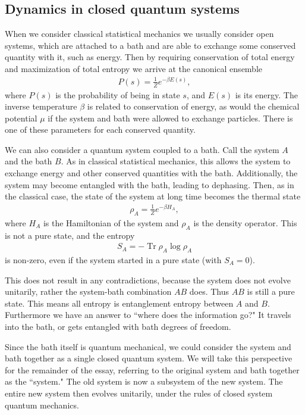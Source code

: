 \documentclass[a4paper,11pt]{article}
\renewcommand{\th}[1]{\frac{1}{#1}}
\DeclareMathOperator{\Tr}{Tr}
\begin{document}
\subsection{Dynamics in closed quantum systems} \label{sub:closed}

When we consider classical statistical mechanics we usually consider open systems, which are attached to a bath and are able to exchange some conserved quantity with it, such as energy. Then by requiring conservation of total energy and maximization of total entropy we arrive at the canonical ensemble
\begin{align}
P(s)=\th{Z}e^{-\beta E(s)},
\end{align}
where $P(s)$ is the probability of being in state $s$, and $E(s)$ is its energy. The inverse temperature $\beta$ is related to conservation of energy, as would the chemical potential $\mu$ if the system and bath were allowed to exchange particles. There is one of these parameters for each conserved quantity.

We can also consider a quantum system coupled to a bath. Call the system $A$ and the bath $B$. As in classical statistical mechanics, this allows the system to exchange energy and other conserved quantities with the bath. Additionally, the system may become entangled with the bath, leading to dephasing. Then, as in the classical case, the state of the system at long time becomes the thermal state
\begin{align}
\rho_A = \th{Z}e^{-\beta H_A},
\end{align}
where $H_A$ is the Hamiltonian of the system and $\rho_A$ is the density operator. This is not a pure state, and the entropy
\begin{align}
S_A=-\Tr\rho_A\log\rho_A
\end{align}
is non-zero, even if the system started in a pure state (with $S_A=0$).

This does not result in any contradictions, because the system does not evolve unitarily, rather the system-bath combination $AB$ does. Thus $AB$ is still a pure state. This means all entropy is entanglement entropy between $A$ and $B$. Furthermore we have an answer to ``where does the information go?" It travels into the bath, or gets entangled with bath degrees of freedom. 

Since the bath itself is quantum mechanical, we could consider the system and bath together as a single closed quantum system. We will take this perspective for the remainder of the essay, referring to the original system and bath together as the ``system." The old system is now a subsystem of the new system. The entire new system then evolves unitarily, under the rules of closed system quantum mechanics.
\end{document}
